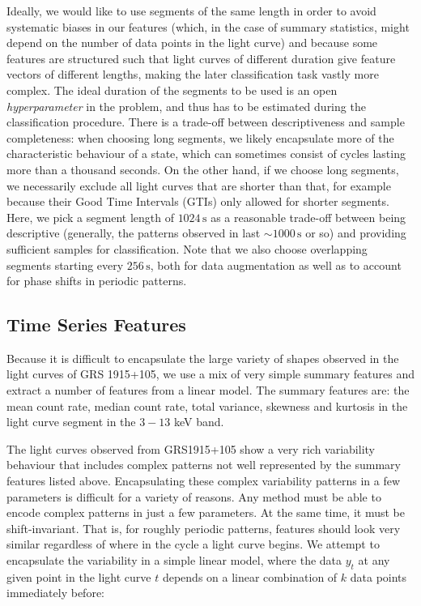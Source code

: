 \documentclass[12pt]{emulateapj}
\begin{document}
Ideally, we would like to use segments of the same length in order to avoid systematic biases in our features (which, in the case of summary statistics, might depend on the number of data points in the light curve) and because some features are structured such that light curves of different duration give feature vectors of different lengths, making the later classification task vastly more complex. The ideal duration of the segments to be used is an open \textit{hyperparameter} in the problem, and thus has to be estimated during the classification procedure. There is a trade-off between descriptiveness and sample completeness: when choosing long segments, we likely encapsulate more of the characteristic behaviour of a state, which can sometimes consist of cycles lasting more than a thousand seconds. On the other hand, if we choose long segments, we necessarily exclude all light curves that are shorter than that, for example because their Good Time Intervals (GTIs) only allowed for shorter segments. Here, we pick a segment length of $1024\,\mathrm{s}$ as a reasonable trade-off between being descriptive (generally, the patterns observed in \citet{belloni2000} last $\sim\!1000\,\mathrm{s}$ or so) and providing sufficient samples for classification. Note that we also choose overlapping segments starting every $256\,\mathrm{s}$, both for data augmentation as well as to account for phase shifts in periodic patterns. 



\subsection{Time Series Features}

Because it is difficult to encapsulate the large variety of shapes observed in the light curves of GRS 1915+105, we use a mix of very simple summary features and extract a number of features from a linear model. The summary features are: the mean count rate, median count rate, total variance, skewness and kurtosis in the light curve segment in the $3 - 13$ keV band. 

The light curves observed from GRS1915+105 show a very rich variability behaviour that includes complex patterns not well represented by the summary features listed above. Encapsulating these complex variability patterns in a few parameters is difficult for a variety of reasons. Any method must be able to encode complex patterns in just a few parameters. At the same time, it must be shift-invariant. That is, for roughly periodic patterns, features should look very similar regardless of where in the cycle a light curve begins. We attempt to encapsulate the variability in a simple linear model, where the data $y_t$ at any given point in the light curve $t$ depends on a linear combination of $k$ data points immediately before:
\end{document}
